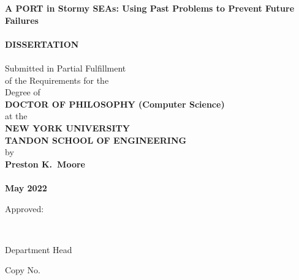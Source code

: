 \thispagestyle{empty}
\begin{center}
{\large
{\bf A PORT in Stormy SEAs: Using Past Problems to Prevent Future Failures}\\
\mbox{} \\
{\huge \bf DISSERTATION}\\
\mbox{} \\
Submitted in Partial Fulfillment\\
of the Requirements for the\\
Degree of\\
{\bf DOCTOR OF PHILOSOPHY (Computer Science)}\\
at the\\
{\bf NEW YORK UNIVERSITY\\TANDON SCHOOL OF ENGINEERING}\\
by\\
{\bf Preston K.\ Moore}\\
\mbox{} \\
{\bf  May 2022}}
\end{center}
\vspace{.35 in}
\hspace{4 in} Approved:

\vspace{.2 in}

\hspace{3.35 in} \hrulefill\

\vspace{-.2 in}

\hspace{3.6 in} Department Head

\vspace{.2 in}

\hspace{-.5 in}Copy No. \hrulefill\ \hspace{4 in}

\vspace{-.4 in}

\hspace{3.35 in} \hrulefill\ %



